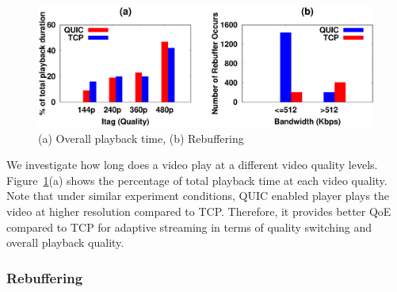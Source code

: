 \begin{figure}[!t]
	\captionsetup[subfigure]{}
	\begin{center}
        \includegraphics[width=0.9\linewidth]{img/plotdata/metric/time_duration_percent_rebuffering}
		\caption{\label{fig:bitrate_rebuffering}(a) Overall playback time,  (b) Rebuffering}
	\end{center}
\end{figure}

We investigate how long does a video play at a different video quality levels.
Figure~\ref{fig:bitrate_rebuffering}(a) shows the percentage of total playback time at each video quality. 
Note that under similar experiment conditions, QUIC enabled player plays the video at higher resolution compared to TCP. Therefore, it provides better QoE compared to TCP for adaptive streaming in terms of quality switching and overall playback quality. 



\subsubsection{Rebuffering}

